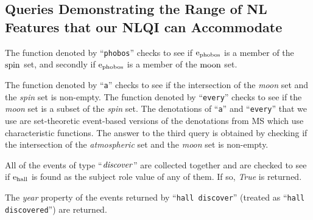 \documentclass[../main.tex]{subfiles}
\begin{document}
\begin{refsection}
\subsection{Queries Demonstrating the Range of NL Features that our NLQI can Accommodate}
\label{webist2019journal:nlexamples}



\examplespacing

\noindent The function denoted by ``\texttt{phobos}'' checks to see if $\mathrm{e}_{\operatorname{phobos}}$ is a member of the $\operatorname{spin}$ set, and secondly if $\mathrm{e}_{\operatorname{phobos}}$ is a member of the $\operatorname{moon}$ set.

\examplespacing




\examplespacing

\noindent The function denoted by ``\texttt{a}'' checks to see if the intersection of the \textit{moon} set and the \textit{spin} set is non-empty. The function denoted by ``\texttt{every}'' checks to see if the \textit{moon} set is a subset of the \textit{spin} set. The denotations of ``\texttt{a}'' and ``\texttt{every}'' that we use are set-theoretic event-based versions of the denotations from MS which use characteristic functions.  The answer to the third query is obtained by checking if the intersection of the \textit{atmospheric} set and the \textit{moon} set is non-empty.

\examplespacing


\examplespacing

\noindent All of the events of type ``$\operatorname{\mathit{discover}}$'' are collected together and are checked to see if $\mathrm{e}_{\operatorname{hall}}$ is found as the subject role value of any of them. If so, \textit{True} is returned.

\examplespacing


\examplespacing

\noindent The {\em year} property of the  events returned by ``\texttt{hall discover}'' (treated as ``\texttt{hall discovered}'') are returned.

\examplespacing


\end{refsection}
\end{document}

